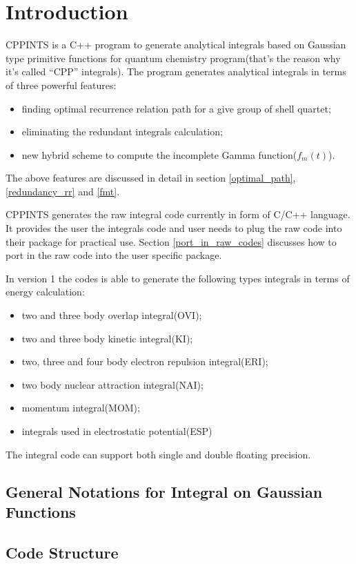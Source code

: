 %
% 
%
\chapter{Introduction}

CPPINTS is a C++ program to generate analytical integrals based on Gaussian type primitive 
functions for quantum chemistry program(that's the reason why it's called ``CPP'' integrals). 
The program generates analytical integrals in terms of three powerful features:
\begin{itemize}
 \item finding optimal recurrence relation path for a give group of shell quartet; 
 \item eliminating the redundant integrals calculation;
 \item new hybrid scheme to compute the incomplete Gamma function($f_{m}(t)$).
\end{itemize}
The above features are discussed in detail in section \ref{optimal_path}, \ref{redundancy_rr}
and \ref{fmt}.

CPPINTS generates the raw integral code currently in form of C/C++ language. It provides
the user the integrals code and user needs to plug the raw code into their package for 
practical use. Section \ref{port_in_raw_codes} discusses how to port in the raw code
into the user specific package.

In version 1 the codes is able to generate the following types integrals in terms of energy 
calculation:
\begin{itemize}
 \item two and three body overlap integral(OVI);
 \item two and three body kinetic integral(KI);
 \item two, three and four body electron repulsion integral(ERI);
 \item two body nuclear attraction integral(NAI);
 \item momentum integral(MOM);
 \item integrals used in electrostatic potential(ESP)
\end{itemize}
The integral code can support both single and double floating precision.

\section{General Notations for Integral on Gaussian Functions}

\section{Code Structure}

